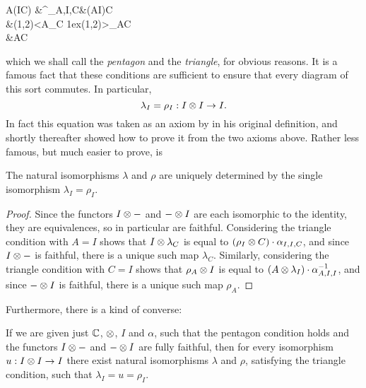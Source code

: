 \documentclass{robinthesisdraft}
\begin{document}
	\begin{diagram}
        A\tn(I\tn C) &\rTo^{\alpha_{A,I,C}}&(A\tn I)\tn C\\
        &\rdTo[snake=-1ex](1,2)<{A\tn\lambda_C}
			\raise1ex\dnum\ldTo[snake=1ex](1,2)>{\rho_A\tn C}\\
        &A\tn C
	\end{diagram}
	which we shall call the \emph{pentagon} and the \emph{triangle},
	for obvious reasons.
	It is a famous fact
	that these conditions are sufficient to ensure that every diagram
	of this sort commutes. In particular,
	\[
		\lambda_{I}=\rho_{I}: I\tn I\to I.
	\]
	In fact this equation was taken as an axiom by \citet{MLCoh}
	in his original definition, and shortly thereafter \citet{KellyML}
	showed how to prove it from the two axioms above.
	Rather less famous, but much easier to prove, is
	\begin{lemma}\label{lemma-lr-uq}
		The natural isomorphisms $\lambda$ and $\rho$ are uniquely
		determined by the single isomorphism $\lambda_{I}=\rho_{I}$.
	\end{lemma}
	\begin{proof}
		Since the functors $I\tn-$ and $-\tn I$ are each isomorphic to
		the identity, they are equivalences, so in particular are
		faithful. Considering the triangle condition with $A=I$ shows
		that $I\tn\lambda_{C}$ is equal to $(\rho_{I}\tn C)\cdot\alpha_{I,I,C}$,
		and since $I\tn-$ is faithful, there is a unique such map $\lambda_{C}$.
		Similarly, considering the triangle condition with $C=I$ shows
		that $\rho_{A}\tn I$ is equal to $(A\tn\lambda_{I})\cdot\alpha_{A,I,I}^{-1}$,
		and since $-\tn I$ is faithful, there is a unique such map $\rho_{A}$.
	\end{proof}
	Furthermore, there is a kind of converse:
	\begin{lemma}\label{lemma-lr-exist}
		If we are given just $\mathbb{C}$, $\tn$, $I$ and $\alpha$, such that
		the pentagon condition holds and the functors $I\tn-$ and $-\tn I$
		are fully faithful, then for every isomorphism $u:I\tn I\to I$
		there exist natural isomorphisms $\lambda$ and $\rho$, satisfying
		the triangle condition, such that $\lambda_{I} = u = \rho_{I}$.
	\end{lemma}
\end{document}
